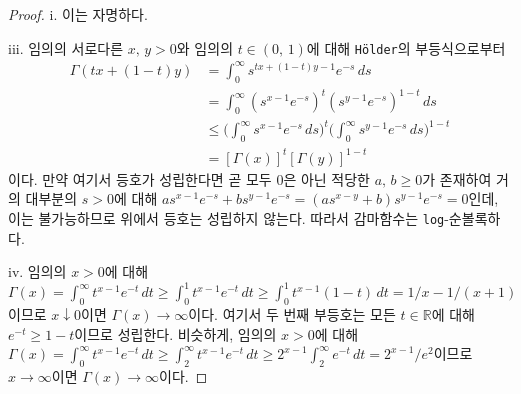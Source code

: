 \begin{proof}
    i. 이는 자명하다.

    iii. 임의의 서로다른 $x,\,y>0$와 임의의 $t\in(0,\,1)$에 대해 \texttt{H\"older}의 부등식으로부터
    \begin{align*}
        \Gamma(tx+(1-t)y)&=\int_0^\infty s^{tx+(1-t)y-1}e^{-s}\,ds\\
        &=\int_0^\infty(s^{x-1}e^{-s})^t(s^{y-1}e^{-s})^{1-t}\,ds\\
        &\leq\bigg(\int_0^\infty s^{x-1}e^{-s}\,ds\bigg)^t\bigg(\int_0^\infty s^{y-1}e^{-s}\,ds\bigg)^{1-t}\\
        &=[\Gamma(x)]^t[\Gamma(y)]^{1-t}
    \end{align*}
    이다. 만약 여기서 등호가 성립한다면 곧 모두 $0$은 아닌 적당한 $a,\,b\geq0$가 존재하여 거의 대부분의 $s>0$에 대해 $as^{x-1}e^{-s}+bs^{y-1}e^{-s}=(as^{x-y}+b)s^{y-1}e^{-s}=0$인데, 이는 불가능하므로 위에서 등호는 성립하지 않는다. 따라서 감마함수는 \texttt{log}-순볼록하다.

    iv. 임의의 $x>0$에 대해 $\Gamma(x)=\int_0^\infty t^{x-1}e^{-t}\,dt\geq\int_0^1 t^{x-1}e^{-t}\,dt\geq\int_0^1 t^{x-1}(1-t)\,dt=1/x-1/(x+1)$이므로 $x\downarrow0$이면 $\Gamma(x)\to\infty$이다. 여기서 두 번째 부등호는 모든 $t\in\mathbb{R}$에 대해 $e^{-t}\geq1-t$이므로 성립한다. 비슷하게, 임의의 $x>0$에 대해 $\Gamma(x)=\int_0^\infty t^{x-1}e^{-t}\,dt\geq\int_2^\infty t^{x-1}e^{-t}\,dt\geq2^{x-1}\int_2^\infty e^{-t}\,dt=2^{x-1}/e^2$이므로 $x\to\infty$이면 $\Gamma(x)\to\infty$이다.


\end{proof}
